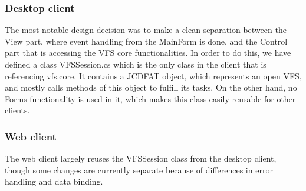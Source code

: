 \documentclass[a4paper,12pt]{article}
\begin{document}
\subsubsection{Desktop client}
The most notable design decision was to make a clean separation between the View part, where event handling from the MainForm is done, and the Control part that is accessing the VFS core functionalities. In order to do this, we have defined a class VFSSession.cs which is the only class in the client that is referencing vfs.core. It contains a JCDFAT object, which represents an open VFS, and mostly calls methods of this object to fulfill its tasks. On the other hand, no Forms functionality is used in it, which makes this class easily reusable for other clients.

\subsubsection{Web client}

The web client largely reuses the VFSSession class from the desktop client, though some changes are currently separate because of differences in error handling and data binding.
\end{document}
